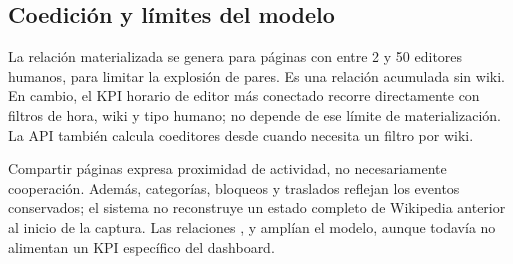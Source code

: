 \subsection{Coedición y límites del modelo}
La relación materializada  se genera para páginas con entre 2 y 50 editores humanos, para limitar la explosión de pares. Es una relación acumulada sin wiki. En cambio, el KPI horario de editor más conectado recorre directamente  con filtros de hora, wiki y tipo humano; no depende de ese límite de materialización. La API también calcula coeditores desde  cuando necesita un filtro por wiki.

Compartir páginas expresa proximidad de actividad, no necesariamente cooperación. Además, categorías, bloqueos y traslados reflejan los eventos conservados; el sistema no reconstruye un estado completo de Wikipedia anterior al inicio de la captura. Las relaciones ,  y  amplían el modelo, aunque todavía no alimentan un KPI específico del dashboard.
